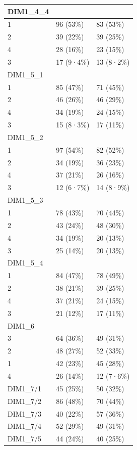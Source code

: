 \documentclass[
]{book}
\begin{document}
\begin{tabular}{l|l|l}
\hline
DIM1\_4\_4 &  & \\
\hline
1 & 96 (53\%) & 83 (53\%)\\
\hline
2 & 39 (22\%) & 39 (25\%)\\
\hline
4 & 28 (16\%) & 23 (15\%)\\
\hline
3 & 17 (9·4\%) & 13 (8·2\%)\\
\hline
DIM1\_5\_1 &  & \\
\hline
1 & 85 (47\%) & 71 (45\%)\\
\hline
2 & 46 (26\%) & 46 (29\%)\\
\hline
4 & 34 (19\%) & 24 (15\%)\\
\hline
3 & 15 (8·3\%) & 17 (11\%)\\
\hline
DIM1\_5\_2 &  & \\
\hline
1 & 97 (54\%) & 82 (52\%)\\
\hline
2 & 34 (19\%) & 36 (23\%)\\
\hline
4 & 37 (21\%) & 26 (16\%)\\
\hline
3 & 12 (6·7\%) & 14 (8·9\%)\\
\hline
DIM1\_5\_3 &  & \\
\hline
1 & 78 (43\%) & 70 (44\%)\\
\hline
2 & 43 (24\%) & 48 (30\%)\\
\hline
4 & 34 (19\%) & 20 (13\%)\\
\hline
3 & 25 (14\%) & 20 (13\%)\\
\hline
DIM1\_5\_4 &  & \\
\hline
1 & 84 (47\%) & 78 (49\%)\\
\hline
2 & 38 (21\%) & 39 (25\%)\\
\hline
4 & 37 (21\%) & 24 (15\%)\\
\hline
3 & 21 (12\%) & 17 (11\%)\\
\hline
DIM1\_6 &  & \\
\hline
3 & 64 (36\%) & 49 (31\%)\\
\hline
2 & 48 (27\%) & 52 (33\%)\\
\hline
1 & 42 (23\%) & 45 (28\%)\\
\hline
4 & 26 (14\%) & 12 (7·6\%)\\
\hline
DIM1\_7/1 & 45 (25\%) & 50 (32\%)\\
\hline
DIM1\_7/2 & 86 (48\%) & 70 (44\%)\\
\hline
DIM1\_7/3 & 40 (22\%) & 57 (36\%)\\
\hline
DIM1\_7/4 & 52 (29\%) & 49 (31\%)\\
\hline
DIM1\_7/5 & 44 (24\%) & 40 (25\%)\\

\end{tabular}
\end{document}
